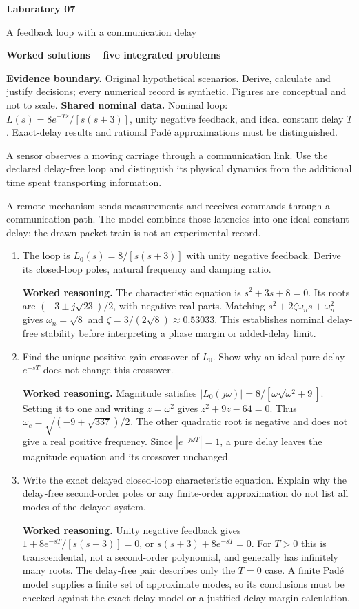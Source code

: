 \documentclass[10pt,a4paper]{article}
\newcommand{\task}[2]{\par\medskip{\color{ink}\Large\bfseries #1. #2}\par\smallskip}
\newcommand{\answer}{\par\smallskip\textbf{Worked reasoning.} }
\begin{document}
{\color{ink}\LARGE\bfseries Laboratory 07}\par
{\large A feedback loop with a communication delay}\par
\textbf{Worked solutions -- five integrated problems}\par
{\small\textbf{Evidence boundary.} Original hypothetical scenarios. Derive, calculate and justify decisions; every numerical record is synthetic. Figures are conceptual and not to scale.}
\smallskip\textbf{Shared nominal data.} Nominal loop: $L(s)=8e^{-Ts}/[s(s+3)]$, unity negative feedback, and ideal constant delay $T$. Exact-delay results and rational Pad\'e approximations must be distinguished.
\task{1}{A remotely observed actuator}
A sensor observes a moving carriage through a communication link. Use the declared delay-free loop and distinguish its physical dynamics from the additional time spent transporting information.
\begin{center}\resizebox{.60\linewidth}{!}{}\par{\small A remote mechanism sends measurements and receives commands through a communication path. The model combines those latencies into one ideal constant delay; the drawn packet train is not an experimental record.}\end{center}
\begin{enumerate}
\item The loop is $L_0(s)=8/[s(s+3)]$ with unity negative feedback. Derive its closed-loop poles, natural frequency and damping ratio.
\answer The characteristic equation is $s^2+3s+8=0$. Its roots are $(-3\pm j\sqrt{23})/2$, with negative real parts. Matching $s^2+2\zeta\omega_n s+\omega_n^2$ gives $\omega_n=\sqrt8$ and $\zeta=3/(2\sqrt8)\approx0.53033$. This establishes nominal delay-free stability before interpreting a phase margin or added-delay limit.
\item Find the unique positive gain crossover of $L_0$. Show why an ideal pure delay $e^{-sT}$ does not change this crossover.
\answer Magnitude satisfies $|L_0(j\omega)|=8/[\omega\sqrt{\omega^2+9}]$. Setting it to one and writing $z=\omega^2$ gives $z^2+9z-64=0$. Thus $\omega_c=\sqrt{(-9+\sqrt{337})/2}$. The other quadratic root is negative and does not give a real positive frequency. Since $|e^{-j\omega T}|=1$, a pure delay leaves the magnitude equation and its crossover unchanged.
\item Write the exact delayed closed-loop characteristic equation. Explain why the delay-free second-order poles or any finite-order approximation do not list all modes of the delayed system.
\answer Unity negative feedback gives $1+8e^{-sT}/[s(s+3)]=0$, or $s(s+3)+8e^{-sT}=0$. For $T>0$ this is transcendental, not a second-order polynomial, and generally has infinitely many roots. The delay-free pair describes only the $T=0$ case. A finite Padé model supplies a finite set of approximate modes, so its conclusions must be checked against the exact delay model or a justified delay-margin calculation.
\end{enumerate}
\end{document}
